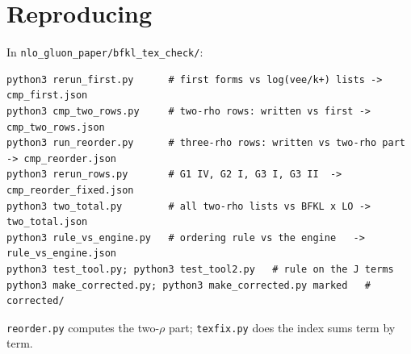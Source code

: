 \documentclass[10pt]{article}
\begin{document}
\section{Reproducing}
In \texttt{nlo\_gluon\_paper/bfkl\_tex\_check/}:
\begin{verbatim}
python3 rerun_first.py      # first forms vs log(vee/k+) lists -> cmp_first.json
python3 cmp_two_rows.py     # two-rho rows: written vs first -> cmp_two_rows.json
python3 run_reorder.py      # three-rho rows: written vs two-rho part -> cmp_reorder.json
python3 rerun_rows.py       # G1 IV, G2 I, G3 I, G3 II  -> cmp_reorder_fixed.json
python3 two_total.py        # all two-rho lists vs BFKL x LO -> two_total.json
python3 rule_vs_engine.py   # ordering rule vs the engine   -> rule_vs_engine.json
python3 test_tool.py; python3 test_tool2.py   # rule on the J terms
python3 make_corrected.py; python3 make_corrected.py marked   # corrected/
\end{verbatim}
\texttt{reorder.py} computes the two-$\rho$ part; \texttt{texfix.py} does the index sums term by term.
\end{document}
